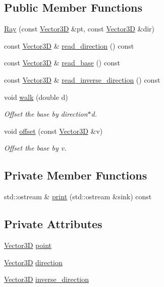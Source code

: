 \subsection*{Public Member Functions}
\begin{DoxyCompactItemize}
\item 
\mbox{\hyperlink{classRay_a9fad894cf932e40e035eb93ed880577b}{Ray}} (const \mbox{\hyperlink{classVector3D}{Vector3D}} \&pt, const \mbox{\hyperlink{classVector3D}{Vector3D}} \&dir)
\item 
const \mbox{\hyperlink{classVector3D}{Vector3D}} \& \mbox{\hyperlink{classRay_a3c37bb998b46af694a2055dc58558925}{read\+\_\+direction}} () const
\item 
const \mbox{\hyperlink{classVector3D}{Vector3D}} \& \mbox{\hyperlink{classRay_a33eec320d0435f66ec1165fe88356612}{read\+\_\+base}} () const
\item 
const \mbox{\hyperlink{classVector3D}{Vector3D}} \& \mbox{\hyperlink{classRay_a280b269d134e49fd81951c538afd3ce9}{read\+\_\+inverse\+\_\+direction}} () const
\item 
void \mbox{\hyperlink{classRay_af986618fceed92c3c189f8950deb6d21}{walk}} (double d)
\begin{DoxyCompactList}\small\item\em Offset the base by direction$\ast$d. \end{DoxyCompactList}\item 
void \mbox{\hyperlink{classRay_ab5669d08ac75473d52cb4e0ade79b6c1}{offset}} (const \mbox{\hyperlink{classVector3D}{Vector3D}} \&v)
\begin{DoxyCompactList}\small\item\em Offset the base by v. \end{DoxyCompactList}\end{DoxyCompactItemize}
\subsection*{Private Member Functions}
\begin{DoxyCompactItemize}
\item 
std\+::ostream \& \mbox{\hyperlink{classRay_affe30fb07c70905f6934c2baeb8a4c27}{print}} (std\+::ostream \&sink) const
\end{DoxyCompactItemize}
\subsection*{Private Attributes}
\begin{DoxyCompactItemize}
\item 
\mbox{\hyperlink{classVector3D}{Vector3D}} \mbox{\hyperlink{classRay_a35cd5ddd116f79b927e5ce1dfaca64c7}{point}}
\item 
\mbox{\hyperlink{classVector3D}{Vector3D}} \mbox{\hyperlink{classRay_afe8cae110601e8ece9edd45ba500c2d0}{direction}}
\item 
\mbox{\hyperlink{classVector3D}{Vector3D}} \mbox{\hyperlink{classRay_a58bfdb8ab63bad3882999e5d2113a927}{inverse\+\_\+direction}}
\end{DoxyCompactItemize}
